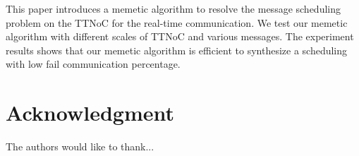 \documentclass[conference]{IEEEtran}
\begin{document}
This paper introduces a memetic algorithm to resolve the message scheduling problem on the TTNoC for the real-time communication. We test our memetic algorithm with different scales of TTNoC and various messages. The experiment results shows that our memetic algorithm is efficient to synthesize a scheduling with low fail communication percentage.








\section*{Acknowledgment}


The authors would like to thank...







%
%
%







\end{document}
